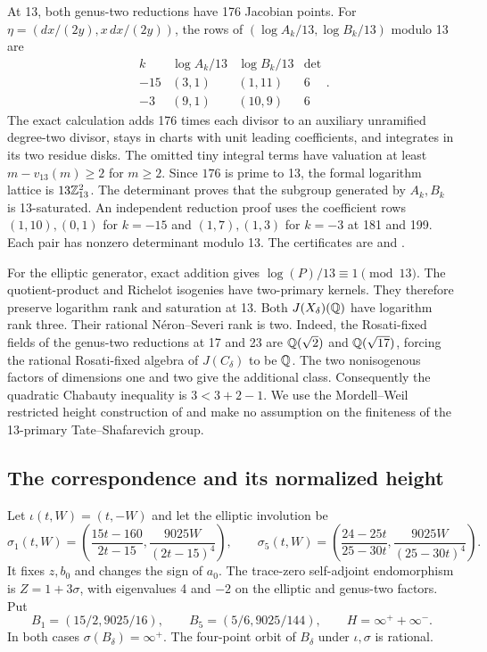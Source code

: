 At 13, both genus-two reductions have 176 Jacobian points. For
$\eta=(dx/(2y),x\,dx/(2y))$, the rows of
$(\log A_k/13,\log B_k/13)$ modulo 13 are
\[
 \begin{array}{c|cc|c}
 k&\log A_k/13&\log B_k/13&\det\\ \hline
 -15&(3,1)&(1,11)&6\\
 -3 &(9,1)&(10,9)&6
 \end{array}.
\]
The exact calculation adds 176 times each divisor to an auxiliary
unramified degree-two divisor, stays in charts with unit leading
coefficients, and integrates in its two residue disks. The omitted tiny
integral terms have valuation at least $m-v_{13}(m)\geq2$ for $m\geq2$.
Since $176$ is prime to 13, the formal logarithm lattice is
$13\mathbb Z_{13}^2$. The determinant proves that the subgroup generated
by $A_k,B_k$ is 13-saturated. An independent reduction proof uses the
coefficient rows $(1,10),(0,1)$ for $k=-15$ and $(1,7),(1,3)$ for
$k=-3$ at 181 and 199. Each pair has nonzero determinant modulo 13.
The certificates are  and
.

For the elliptic generator, exact addition gives
$\log(P)/13\equiv1\pmod{13}$. The quotient-product and Richelot
isogenies have two-primary kernels. They therefore preserve logarithm
rank and saturation at 13. Both $J(X_\delta)(\mathbb Q)$ have logarithm
rank three. Their rational Néron--Severi rank is two. Indeed, the
Rosati-fixed fields of the genus-two reductions at 17 and 23 are
$\mathbb Q(\sqrt2)$ and $\mathbb Q(\sqrt{17})$, forcing the rational
Rosati-fixed algebra of $J(C_\delta)$ to be $\mathbb Q$. The two
nonisogenous factors of dimensions one and two give the additional
class. Consequently the quadratic Chabauty inequality is
$3<3+2-1$. We use the Mordell--Weil restricted height construction of
\cite{BalakrishnanDogra2018} and
make no assumption on the finiteness of the 13-primary Tate--Shafarevich
group.

\subsection{The correspondence and its normalized height}

Let $\iota(t,W)=(t,-W)$ and let the elliptic involution be
\[
 \sigma_1(t,W)=\left(\frac{15t-160}{2t-15},
                         \frac{9025W}{(2t-15)^4}\right),\qquad
 \sigma_5(t,W)=\left(\frac{24-25t}{25-30t},
                         \frac{9025W}{(25-30t)^4}\right).
\]
It fixes $z,b_0$ and changes the sign of $a_0$. The trace-zero
self-adjoint endomorphism is $Z=1+3\sigma$, with eigenvalues 4 and
$-2$ on the elliptic and genus-two factors. Put
\[
 B_1=(15/2,9025/16),\qquad B_5=(5/6,9025/144),\qquad
 H=\infty^++\infty^-.
\]
In both cases $\sigma(B_\delta)=\infty^+$. The four-point orbit of
$B_\delta$ under $\iota,\sigma$ is rational.

